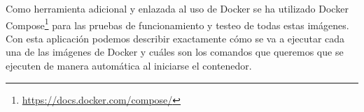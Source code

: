 Como herramienta adicional y enlazada al uso de Docker se ha utilizado Docker Compose\footnote{\url{https://docs.docker.com/compose/}} para las pruebas de funcionamiento y testeo de todas estas imágenes.
Con esta aplicación podemos describir exactamente cómo se va a ejecutar cada una de las imágenes de Docker y cuáles son los comandos que queremos que se ejecuten de manera automática al iniciarse el contenedor.